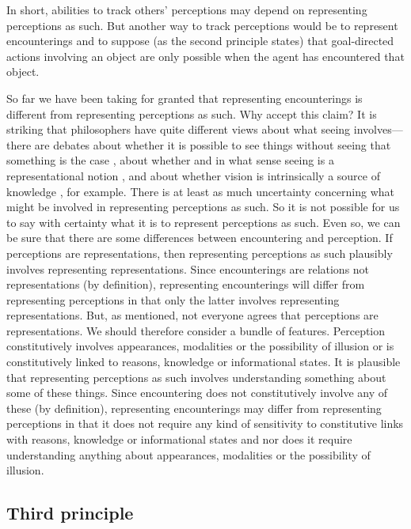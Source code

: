 \documentclass[12pt,\papersize]{extarticle}
\begin{document}
In short, 
abilities to track others' perceptions  may depend on representing perceptions as such.
But another way to track perceptions would be to represent encounterings and to suppose (as the second principle states) that goal-directed actions involving an object are only possible when the agent has encountered that object.


So far we have been taking for granted that representing encounterings is different from representing perceptions as such.
Why accept this claim? 
It is striking that philosophers have quite different views about what seeing involves—there are debates about whether it is possible to see things without seeing that something is the case \citep[e.g.][]{en_1671}, about whether and in what sense seeing is a representational notion \citep[]{en_1619, en_1705}, and about whether vision is intrinsically a source of knowledge \citep[]{en_1706}, for example.  
There is at least as much uncertainty concerning what might be involved in representing perceptions as such. 
So it is not possible for us to say with certainty what it is to represent perceptions as such.  
Even so, we can be sure that there are some differences between encountering and perception.
If perceptions are representations, then representing perceptions as such plausibly involves representing representations.
Since encounterings are relations not representations (by definition), representing encounterings will  differ from representing perceptions in that only the latter involves representing representations.
But, as mentioned, not everyone agrees that perceptions are representations.
We should therefore consider a bundle of features.
Perception constitutively involves appearances, modalities or the possibility of illusion or is constitutively linked to reasons, knowledge or informational states.
It is plausible that representing perceptions as such involves understanding something about some of these things.
Since encountering does not constitutively involve any of these (by definition), 
representing encounterings may differ from representing perceptions in that it does not require any kind of sensitivity to constitutive links with reasons, knowledge or informational states and nor does it require understanding  anything about appearances, modalities or the possibility of illusion.



\subsection{Third principle}
\end{document}
